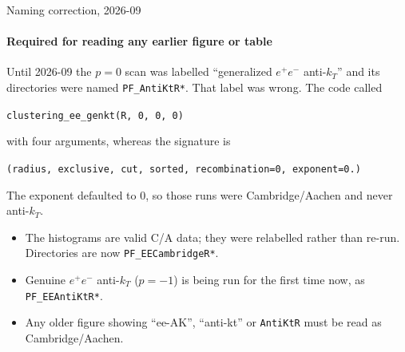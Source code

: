 \documentclass[aspectratio=169,10pt]{beamer}
\newcommand{\ee}{$e^{+}e^{-}$}
\newcommand{\Cca}[1]{\textcolor{caviolet}{#1}}
\newcommand{\Cakt}[1]{\textcolor{aktteal}{#1}}
\begin{document}
\begin{frame}{Naming correction, 2026-09}
  \framesubtitle{Required for reading any earlier figure or table}

  Until 2026-09 the $p = 0$ scan was labelled ``generalized \ee{} anti-$k_T$''
  and its directories were named \texttt{PF\_AntiKtR*}. That label was wrong.
  The code called

  \begin{center}
    \texttt{clustering\_ee\_genkt(R, 0, 0, 0)}
  \end{center}

  with four arguments, whereas the signature is

  \begin{center}
    \texttt{(radius, exclusive, cut, sorted, recombination=0, exponent=0.)}
  \end{center}

  The exponent defaulted to $0$, so those runs were \Cca{Cambridge/Aachen} and
  never anti-$k_T$.

  \medskip
  \begin{itemize}
    \item The histograms are valid C/A data; they were relabelled rather than
          re-run. Directories are now \Cca{\texttt{PF\_EECambridgeR*}}.
    \item Genuine \ee{} anti-$k_T$ ($p = -1$) is being run for the first time
          now, as \Cakt{\texttt{PF\_EEAntiKtR*}}.
    \item Any older figure showing ``ee-AK'', ``anti-kt'' or \texttt{AntiKtR}
          must be read as Cambridge/Aachen.
  \end{itemize}
\end{frame}
\end{document}
